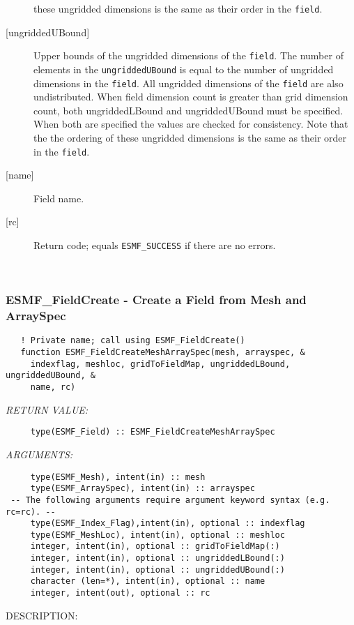 \begin{description}
   these ungridded dimensions is the same as their order in the {\tt field}.
   \item [{[ungriddedUBound]}]
   Upper bounds of the ungridded dimensions of the {\tt field}.
   The number of elements in the {\tt ungriddedUBound} is equal to the number of ungridded
   dimensions in the {\tt field}. All ungridded dimensions of the
   {\tt field} are also undistributed. When field dimension count is
   greater than grid dimension count, both ungriddedLBound and ungriddedUBound
   must be specified. When both are specified the values are checked
   for consistency. Note that the the ordering of
   these ungridded dimensions is the same as their order in the {\tt field}.
   \item [{[name]}]
   Field name.
   \item [{[rc]}]
   Return code; equals {\tt ESMF\_SUCCESS} if there are no errors.
   \end{description} 
 
\mbox{}\hrulefill\ 
 
\subsubsection [ESMF\_FieldCreate] {ESMF\_FieldCreate - Create a Field from Mesh and ArraySpec}


\begin{verbatim}   ! Private name; call using ESMF_FieldCreate()
   function ESMF_FieldCreateMeshArraySpec(mesh, arrayspec, &
     indexflag, meshloc, gridToFieldMap, ungriddedLBound, ungriddedUBound, &
     name, rc)\end{verbatim}{\em RETURN VALUE:}
\begin{verbatim}     type(ESMF_Field) :: ESMF_FieldCreateMeshArraySpec\end{verbatim}{\em ARGUMENTS:}
\begin{verbatim}     type(ESMF_Mesh), intent(in) :: mesh
     type(ESMF_ArraySpec), intent(in) :: arrayspec
 -- The following arguments require argument keyword syntax (e.g. rc=rc). --
     type(ESMF_Index_Flag),intent(in), optional :: indexflag
     type(ESMF_MeshLoc), intent(in), optional :: meshloc
     integer, intent(in), optional :: gridToFieldMap(:)
     integer, intent(in), optional :: ungriddedLBound(:)
     integer, intent(in), optional :: ungriddedUBound(:)
     character (len=*), intent(in), optional :: name
     integer, intent(out), optional :: rc\end{verbatim}
{\sf DESCRIPTION:\\ }


